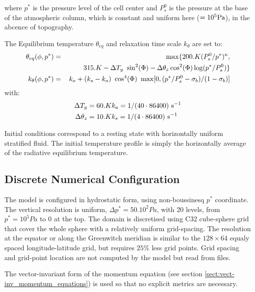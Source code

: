 where $p^*$ is the pressure level of the cell center 
and $P^{0}_{s}$ is the pressure at the base of the atmospheric column,
which is constant and uniform here ($= 10^5 {\rm Pa}$), in the abcence 
of topography.

The Equilibrium temperature $\theta_{eq}$ and relaxation time scale $k_{\theta}$ 
are set to:
\begin{eqnarray}
\label{EQ:eg-hs-define_Teq}
\theta_{eq}(\phi,p^*) & = & \max \{ 200.K (P^{0}_{s}/p^*)^\kappa,\\
\nonumber
& & \hspace{8mm} 315.K - \Delta T_y~\sin^2(\Phi) 
  - \Delta \theta_z \cos^2(\Phi) \log(p^*/P^{0}_s) \}
\\
\label{EQ:eg-hs-define_kT}
k_{\theta}(\phi,p^*) & = &
k_a + (k_s -k_a)~\cos^4(\Phi)~\max[0,(p^*/P^{0}_{s}-\sigma_{b})/(1-\sigma_{b})]
\end{eqnarray}
with:
\begin{eqnarray*}
 \Delta T_y = 60.K & k_a = 1/(40 \cdot 86400) ~{\rm s}^{-1}\\
\Delta \theta_z = 10.K & k_s = 1/(4 \cdot 86400) ~{\rm s}^{-1}
\end{eqnarray*}

Initial conditions correspond to a resting state with horizontally uniform 
stratified fluid. The initial temperature profile is simply the 
horizontally average of the radiative equilibrium temperature.

\subsection{Discrete Numerical Configuration}
\label{www:tutorials}

The model is configured in hydrostatic form, using non-boussinesq
$p^*$ coordinate.
The vertical resolution is uniform, $\Delta p^* = 50.10^2 Pa$,
with 20 levels, from $p^*=10^5 Pa$ to $0$ at the top.
The domain is discretised using C32 cube-sphere grid \cite[]{adcroft:04b}
that cover the whole sphere with a relatively uniform grid-spacing.
The resolution at the equator or along the Greenwitch meridian
is similar to the $128 \times 64$ equaly spaced longitude-latitude grid,
but requires $25\%$ less grid points.
Grid spacing and grid-point location are not computed by the model but
read from files.

The vector-invariant form of the momentum equation (see section
\ref{sect:vect-inv_momentum_equations}) is used so that no explicit 
metrics are necessary.


